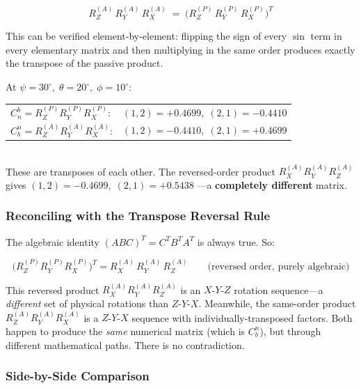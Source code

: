 \documentclass[12pt,a4paper]{article}
\begin{document}
\begin{equation}
\boxed{
  R_Z^{(A)}\, R_Y^{(A)}\, R_X^{(A)}
  \;=\;
  \bigl(R_Z^{(P)}\, R_Y^{(P)}\, R_X^{(P)}\bigr)^T
}
\label{eq:same-order-transpose}
\end{equation}

This can be verified element-by-element: flipping the sign of every $\sin$
term in every elementary matrix and then multiplying in the same order
produces exactly the transpose of the passive product.

\begin{keybox}
At $\psi=30^\circ,\;\theta=20^\circ,\;\phi=10^\circ$:
\begin{tabular}{@{}ll@{}}
$C_n^b = R_Z^{(P)} R_Y^{(P)} R_X^{(P)}$: &
  $(1,2) = +0.4699,\; (2,1) = -0.4410$ \\
$C_b^n = R_Z^{(A)} R_Y^{(A)} R_X^{(A)}$: &
  $(1,2) = -0.4410,\; (2,1) = +0.4699$ \\
\end{tabular}\\[4pt]
These are transposes of each other.  The reversed-order product
$R_X^{(A)} R_Y^{(A)} R_Z^{(A)}$ gives $(1,2) = -0.4699,\; (2,1) = +0.5438$
---a \textbf{completely different} matrix.
\end{keybox}

\subsubsection*{Reconciling with the Transpose Reversal Rule}

The algebraic identity $(ABC)^T = C^T B^T A^T$ is always true.  So:

\begin{equation}
  \bigl(R_Z^{(P)} R_Y^{(P)} R_X^{(P)}\bigr)^T
  = R_X^{(A)}\, R_Y^{(A)}\, R_Z^{(A)}
  \qquad\text{(reversed order, purely algebraic)}
\end{equation}

This reversed product $R_X^{(A)} R_Y^{(A)} R_Z^{(A)}$ is an $X$-$Y$-$Z$
rotation sequence---a \emph{different} set of physical rotations than
$Z$-$Y$-$X$.  Meanwhile, the same-order product
$R_Z^{(A)} R_Y^{(A)} R_X^{(A)}$ is a $Z$-$Y$-$X$ sequence with
individually-transposed factors.  Both happen to produce the \emph{same}
numerical matrix (which is $C_b^n$), but through different mathematical
paths.  There is no contradiction.

\subsubsection*{Side-by-Side Comparison}
\end{document}
